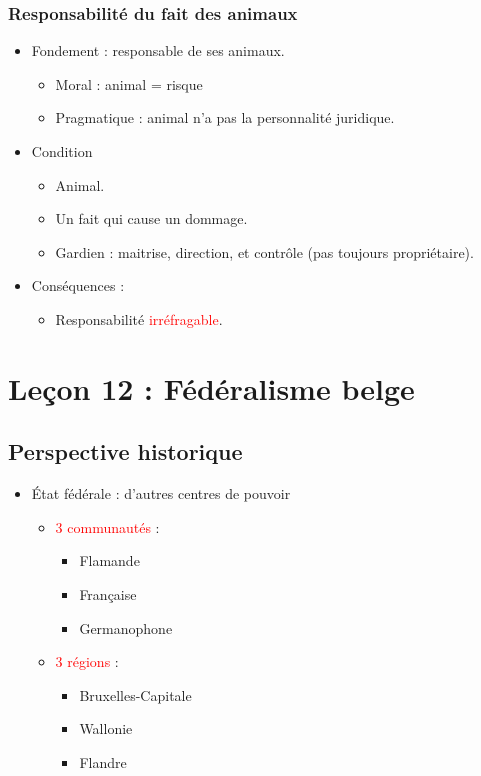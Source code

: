 \subsection{Responsabilité du fait des animaux}
\begin{itemize}
	\item Fondement : responsable de ses animaux.
	\begin{itemize}
		\item Moral : animal = risque
		\item Pragmatique : animal n'a pas la personnalité juridique.
	\end{itemize}
	\item Condition
	\begin{itemize}
		\item Animal.
		\item Un fait qui cause un dommage.
		\item Gardien : maitrise, direction, et contrôle (pas toujours propriétaire).
	\end{itemize}
	\item Conséquences :
	\begin{itemize}
		\item Responsabilité \textcolor{red}{irréfragable}.
	\end{itemize}
\end{itemize}

\newpage
\chapter{Leçon 12 : Fédéralisme belge}

\section{Perspective historique}

\begin{itemize}
	\item État fédérale : d'autres centres de pouvoir
	\begin{itemize}
		\item \textcolor{red}{3 communautés} :
		\begin{itemize}
			\item Flamande
			\item Française
			\item Germanophone
		\end{itemize}
		\item \textcolor{red}{3 régions} :
		\begin{itemize}
			\item Bruxelles-Capitale
			\item Wallonie
			\item Flandre
		\end{itemize}
	\end{itemize}
\end{itemize}

